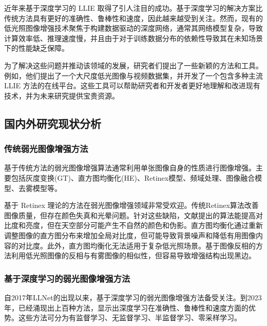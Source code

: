 \documentclass[a4paper]{ctexart}
\begin{document}
	近年来基于深度学习的 LLIE 取得了引人注目的成功。基于深度学习的解决方案比传统方法具有更好的准确性、鲁棒性和速度，因此越来越受到关注。然而，现有的低光照图像增强技术聚焦于构建数据驱动的深度网络，通常其网络模型复杂，导致计算效率低、推理速度慢，并且由于对于训练数据分布的依赖性导致其在未知场景下的性能缺乏保障。
	
	为了解决这些问题并推动该领域的发展，研究者们提出了一些新颖的方法和工具。例如，他们提出了一个大尺度低光图像与视频数据集，并开发了一个包含多种主流 LLIE 方法的在线平台。这些工具可以帮助研究者和开发者更好地理解和改进现有技术，并为未来研究提供宝贵资源。
	
	\subsection{国内外研究现状分析}
	
	\subsubsection{传统弱光图像增强方法}
	基于传统方法的弱光图像增强算法通常利用单张图像自身的性质进行图像增强。主要包括灰度变换(GT)\textcolor{blue}{\cite{ueng1995gamma}}、直方图均衡化(HE)\textcolor{blue}{\cite{stark2000adaptive}}、Retinex模型\textcolor{blue}{\cite{land1971lightness}}、频域处理\textcolor{blue}{\cite{liu2021benchmarking}}、图像融合模型\textcolor{blue}{\cite{dai2019fractional}}、去雾模型\textcolor{blue}{\cite{ma2019improved}}等。
	
	基于 Retinex 理论的方法在弱光图像增强领域非常受欢迎。传统Retinex算法改善图像质量，但存在颜色失真和光晕问题。针对这些缺陷，文献\cite{cooper2004analysis}提出的算法能提高对比度和亮度，但在天空部分可能产生不自然的颜色和伪影。直方图均衡化\cite{stark2000adaptive}通过重新调整图像的直方图分布来增加全局对比度，但可能导致背景噪声和降低有用图像内容的对比度。此外，直方图均衡化无法适用于复杂低光照场景。基于图像反相的方法\cite{dong2010fast}利用低光照图像的反相与有雾图像的相似性，但容易导致增强结构出现黑边。
	
	\subsubsection{基于深度学习的弱光图像增强方法}
	
	自2017年LLNet\cite{lore2017llnet}的出现以来，基于深度学习的弱光图像增强方法备受关注。到2023年，已经涌现出上百种方法，显示出深度学习在准确性、鲁棒性和速度方面的优势。这些方法可分为有监督学习、无监督学习、半监督学习、零采样学习。
	
\end{document}
